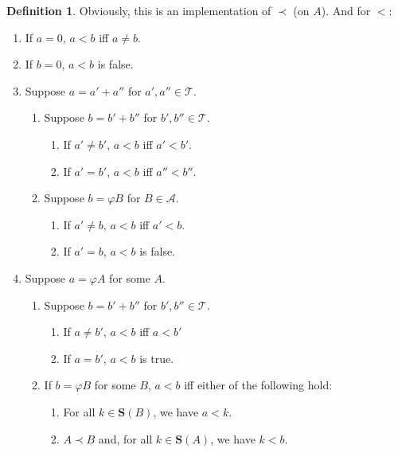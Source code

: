 \documentclass{article}
\theoremstyle{definition}
\newtheorem{definition}{Definition}[section]
\theoremstyle{plain}
\theoremstyle{plain}
\theoremstyle{plain}
\theoremstyle{plain}
\theoremstyle{remark}
\theoremstyle{remark}
\theoremstyle{remark}
\theoremstyle{plain}
\theoremstyle{plain}
\begin{document}
\begin{definition}
Obviously, this is an implementation of $\prec$ (on $A$). And for $<$:

\begin{enumerate}
    \item If $a = 0$, $a < b$ iff $a \neq b$.
    \item If $b = 0$, $a < b$ is false.
    \item Suppose $a = a' + a''$ for $a', a'' \in \mathcal{T}$.
    \begin{enumerate}
        \item Suppose $b = b' + b''$ for $b', b'' \in \mathcal{T}$.
        \begin{enumerate}
            \item If $a' \neq b'$, $a < b$ iff $a' < b'$.
            \item If $a' = b'$, $a < b$ iff $a'' < b''$.
        \end{enumerate}
        \item Suppose $b = \varphi B$ for $B \in \mathcal{A}$.
        \begin{enumerate}
            \item If $a' \neq b$, $a < b$ iff $a' < b$.
            \item If $a' = b$, $a < b$ is false.
        \end{enumerate}
    \end{enumerate}
    \item Suppose $a = \varphi A$ for some $A$.
    \begin{enumerate}
        \item Suppose $b = b' + b''$ for $b', b'' \in \mathcal{T}$.
        \begin{enumerate}
            \item If $a \neq b'$, $a < b$ iff $a < b'$
            \item If $a = b'$, $a < b$ is true.
        \end{enumerate}
        \item If $b = \varphi B$ for some $B$, $a < b$ iff either of the following hold:
        \begin{enumerate}
            \item For all $k \in \mathbf{S}(B)$, we have $a < k$.
            \item $A \prec B$ and, for all $k \in \mathbf{S}(A)$, we have $k < b$.
        \end{enumerate}
    \end{enumerate}
\end{enumerate}
\end{definition}
\end{document}
